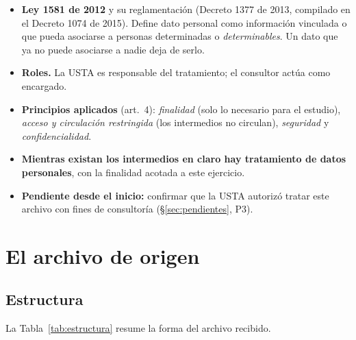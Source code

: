 \documentclass[11pt,a4paper,twoside,twocolumn]{article}
\begin{document}
\begin{itemize}[leftmargin=*,itemsep=2pt,topsep=0pt]
  \item \textbf{Ley 1581 de 2012} y su reglamentación (Decreto 1377 de 2013, compilado en el
  Decreto 1074 de 2015). Define dato personal como información vinculada o que pueda asociarse
  a personas determinadas o \emph{determinables}. Un dato que ya no puede asociarse a nadie deja
  de serlo.
  \item \textbf{Roles.} La USTA es responsable del tratamiento; el consultor actúa como
  encargado.
  \item \textbf{Principios aplicados} (art.~4): \emph{finalidad} (solo lo necesario para el
  estudio), \emph{acceso y circulación restringida} (los intermedios no circulan),
  \emph{seguridad} y \emph{confidencialidad}.
  \item \textbf{Mientras existan los intermedios en claro hay tratamiento de datos personales},
  con la finalidad acotada a este ejercicio.
  \item \textbf{Pendiente desde el inicio:} confirmar que la USTA autorizó tratar este archivo con
  fines de consultoría (§\ref{sec:pendientes}, P3).
\end{itemize}

\section{El archivo de origen}\label{sec:origen}

\subsection{Estructura}

La Tabla~\ref{tab:estructura} resume la forma del archivo recibido.
\end{document}
